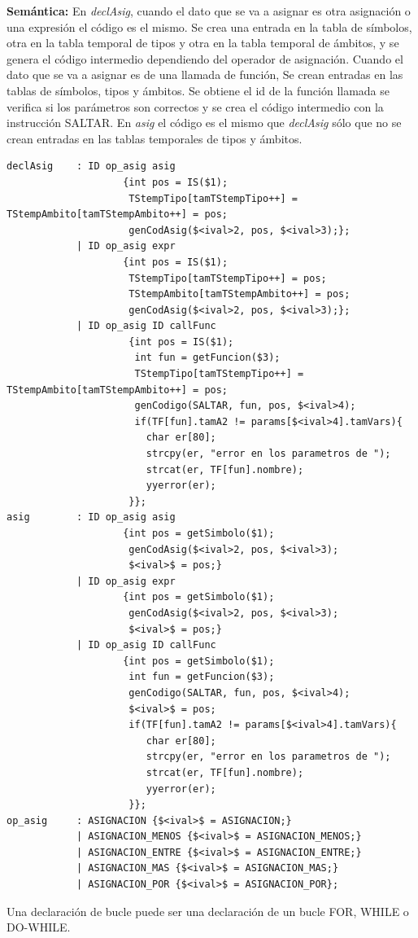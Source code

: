 \documentclass[a4paper,12pt]{article}
\begin{document}
\begin{enumerate}
\begin{enumerate}
\begin{itemize}
   \textbf{Semántica:} En \textit{declAsig}, cuando el dato que se va a asignar es otra asignación o una expresión el código es el mismo. Se crea una entrada en la tabla de símbolos, otra en la
   tabla temporal de tipos y otra en la tabla temporal de ámbitos, y se genera el código intermedio dependiendo del operador de asignación.
   Cuando el dato que se va a asignar es de una llamada de función, Se crean entradas en las tablas de símbolos, tipos y ámbitos. Se obtiene el id de la función llamada
   se verifica si los parámetros son correctos y se crea el código intermedio con la instrucción SALTAR.
   En \textit{asig} el código es el mismo que \textit{declAsig} sólo que no se crean entradas en las tablas temporales de tipos y ámbitos.
   \begin{lstlisting}
declAsig	: ID op_asig asig 
					{int pos = IS($1);
					 TStempTipo[tamTStempTipo++] = TStempAmbito[tamTStempAmbito++] = pos;
					 genCodAsig($<ival>2, pos, $<ival>3);};
			| ID op_asig expr 
					{int pos = IS($1);
					 TStempTipo[tamTStempTipo++] = pos;
					 TStempAmbito[tamTStempAmbito++] = pos;
					 genCodAsig($<ival>2, pos, $<ival>3);};
			| ID op_asig ID callFunc 
					 {int pos = IS($1);
					  int fun = getFuncion($3);
					  TStempTipo[tamTStempTipo++] = TStempAmbito[tamTStempAmbito++] = pos;
					  genCodigo(SALTAR, fun, pos, $<ival>4);
					  if(TF[fun].tamA2 != params[$<ival>4].tamVars){
					 	char er[80];
						strcpy(er, "error en los parametros de ");
						strcat(er, TF[fun].nombre);
						yyerror(er);
					 }};
asig 		: ID op_asig asig
					{int pos = getSimbolo($1);
					 genCodAsig($<ival>2, pos, $<ival>3);
					 $<ival>$ = pos;}
			| ID op_asig expr 
					{int pos = getSimbolo($1);
					 genCodAsig($<ival>2, pos, $<ival>3);
					 $<ival>$ = pos;}
			| ID op_asig ID callFunc 
					{int pos = getSimbolo($1);
					 int fun = getFuncion($3);
					 genCodigo(SALTAR, fun, pos, $<ival>4);
					 $<ival>$ = pos;
					 if(TF[fun].tamA2 != params[$<ival>4].tamVars){
					 	char er[80];
						strcpy(er, "error en los parametros de ");
						strcat(er, TF[fun].nombre);
						yyerror(er);
					 }};
op_asig		: ASIGNACION {$<ival>$ = ASIGNACION;}
			| ASIGNACION_MENOS {$<ival>$ = ASIGNACION_MENOS;}
			| ASIGNACION_ENTRE {$<ival>$ = ASIGNACION_ENTRE;}
			| ASIGNACION_MAS {$<ival>$ = ASIGNACION_MAS;}
			| ASIGNACION_POR {$<ival>$ = ASIGNACION_POR};
   \end{lstlisting}
    Una declaración de bucle puede ser una declaración de un bucle FOR, WHILE o DO-WHILE.
    

\end{itemize}
\end{enumerate}
\end{enumerate}
\end{document}
